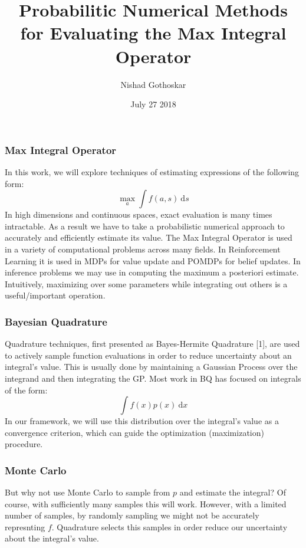 \documentclass[8pt]{beamer}
\title{Probabilitic Numerical Methods for Evaluating the Max Integral Operator}
\author{Nishad Gothoskar}
\institute{Learning and Intelligent Systems}
\date{July 27 2018}
\begin{document}
 
\frame{\titlepage}
 
\begin{frame}
\frametitle{Max Integral Operator}
In this work, we will explore techniques of estimating expressions of the following form:
\begin{equation*}
    \max_{a} \int f(a,s) \ \text{d}s
\end{equation*}
In high dimensions and continuous spaces, exact evaluation is many times intractable. As a result we have to take a probabilistic numerical approach to accurately and efficiently estimate its value.
\newline \newline
The Max Integral Operator is used in a variety of computational problems across many fields. In Reinforcement Learning it is used in MDPs for value update and POMDPs for belief updates. In inference problems we may use in computing the maximum a posteriori estimate.\newline \newline
Intuitively, maximizing over some parameters while integrating out others is a useful/important operation.
\end{frame}

\begin{frame}
\frametitle{Bayesian Quadrature}
Quadrature techniques, first presented as Bayes-Hermite Quadrature [1], are used to actively sample function evaluations in order to reduce uncertainty about an integral's value. This is usually done by maintaining a Gaussian Process over the integrand and then integrating the GP. 
\newline\newline
Most work in BQ has focused on integrals of the form:
\begin{equation*}
   \int f(x) p(x)  \ \text{d}x
\end{equation*}
In our framework, we will use this distribution over the integral's value as a convergence criterion, which can guide the optimization (maximization) procedure.
\end{frame}

\begin{frame}
\frametitle{Monte Carlo}
But why not use Monte Carlo to sample from $p$ and estimate the integral?
\newline\newline
Of course, with sufficiently many samples this will work. However, with a limited number of samples, by randomly sampling we might not be accurately represnting $f$. Quadrature selects this samples in order reduce our uncertainty about the integral's value.
\end{frame}
\end{document}
